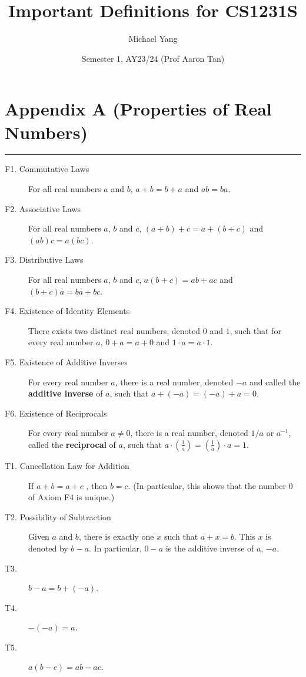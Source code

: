 \documentclass{article}
\title{Important Definitions for CS1231S}
\author{Michael Yang}
\date{Semester 1, AY23/24 (Prof Aaron Tan)}
\begin{document}
\maketitle
\newpage


\section*{Appendix A (Properties of Real Numbers)}
\hrule
\begin{multicols*}{2}
    \begin{description}
        \item[F1. Commutative Laws]For all real numbers $a$ and $b$, $a + b = b + a$ and $ab = ba$.
        \item[F2. Associative Laws]For all real numbers $a$, $b$ and $c$, $(a+b) + c = a + (b + c)$ and $(ab)c = a(bc)$.
        \item[F3. Distributive Laws]For all real numbers $a$, $b$ and $c$, $a(b + c) = ab + ac$ and $(b+c)a = ba + bc$.
        \item[F4. Existence of Identity Elements]There exists two distinct real numbers, denoted $0$ and $1$, such that for every real number $a$, $0 + a = a + 0$ and $1 \cdot a = a \cdot 1$.
        \item[F5. Existence of Additive Inverses]For every real number $a$, there is a real number, denoted $-a$ and called the \textbf{additive inverse} of $a$, such that $a + (-a) = (-a) + a = 0$.
        \item[F6. Existence of Reciprocals]For every real number $a\neq0$, there is a real number, denoted $1/a$ or $a^{-1}$, called the \textbf{reciprocal} of $a$, such that $a \cdot (\frac{1}{a}) = (\frac{1}{a})\cdot a = 1$.
        \item[T1. Cancellation Law for Addition]If $a + b = a + c$ , then $b = c$. (In particular, this shows that the number 0 of Axiom F4 is unique.)
        \item[T2. Possibility of Subtraction]Given $a$ and $b$, there is exactly one $x$ such that $a+x=b$. This $x$ is denoted by $b-a$. In particular, $0-a$ is the additive inverse of $a$, $-a$.
        \item[T3.]$b-a=b+(-a)$.
        \item[T4.]$-(-a)=a$.
        \item[T5.]$a(b-c)=ab-ac$.

\end{description}
\end{multicols*}
\end{document}

